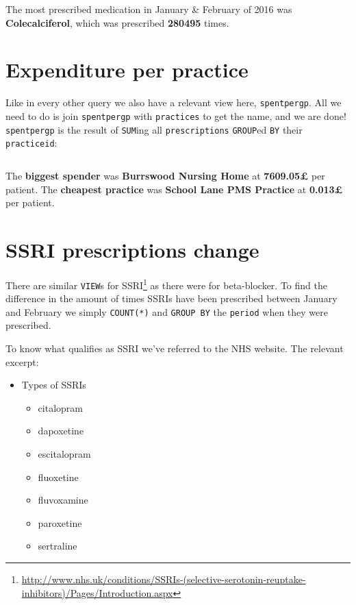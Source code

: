 \documentclass[english,a4paper,]{report}
\renewcommand{\href}[2]{#2\footnote{\url{#1}}}
\providecommand{\tightlist}{%
  \setlength{\itemsep}{0pt}\setlength{\parskip}{0pt}}
\begin{document}
\inputminted[firstline=42,lastline=53]{sql}{src/sql/02-queries.sql}

The most prescribed medication in January \& February of 2016 was
\textbf{Colecalciferol}, which was prescribed \textbf{280495} times.

\section{Expenditure per practice}\label{expenditure-per-practice}

Like in every other query we also have a relevant view here,
\texttt{spentpergp}. All we need to do is join \texttt{spentpergp} with
\texttt{practices} to get the name, and we are done! \texttt{spentpergp}
is the result of \texttt{SUM}ing all \texttt{prescriptions}
\texttt{GROUP}ed \texttt{BY} their \texttt{practiceid}:

\inputminted[firstline=56,lastline=88]{sql}{src/sql/02-queries.sql}

The \textbf{biggest spender} was \textbf{Burrswood Nursing Home} at
\textbf{7609.05£} per patient. The \textbf{cheapest practice} was
\textbf{School Lane PMS Practice} at \textbf{0.013£} per patient.

\section{SSRI prescriptions change}\label{ssri-prescriptions-change}

There are similar \texttt{VIEW}s for
\href{http://www.nhs.uk/conditions/SSRIs-(selective-serotonin-reuptake-inhibitors)/Pages/Introduction.aspx}{SSRI}
as there were for beta-blocker. To find the difference in the amount of
times SSRIs have been prescribed between January and February we simply
\texttt{COUNT(*)} and \texttt{GROUP\ BY} the \texttt{period} when they
were prescribed.

To know what qualifies as SSRI we've referred to the NHS website. The
relevant excerpt:

\begin{itemize}
\tightlist
\item
  Types of SSRIs

  \begin{itemize}
  \tightlist
  \item
    citalopram
  \item
    dapoxetine
  \item
    escitalopram
  \item
    fluoxetine
  \item
    fluvoxamine
  \item
    paroxetine
  \item
    sertraline
  \end{itemize}
\end{itemize}
\end{document}
